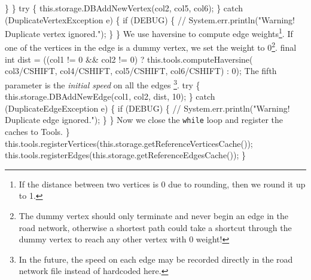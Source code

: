   \}
\}
try \{
  this.storage.DBAddNewVertex(col2, col5, col6);
\} catch (DuplicateVertexException e) \{
  if (DEBUG) \{
    // System.err.println("Warning! Duplicate vertex ignored.");
  \}
\}
\nwendcode{}\nwdocspar
{\small We use haversine to compute edge weights\footnote{If the distance between two
vertices is 0 due to rounding, then we round it up to 1.}.  If one of the
vertices in the edge is a dummy vertex, we set the weight to 0\footnote{The
dummy vertex should only terminate and never begin an edge in the road network,
otherwise a shortest path could take a shortcut through the dummy vertex to
reach any other vertex with 0 weight!}.}
\nwenddocs{}\plusendmoddef
final int dist = ((col1 != 0 && col2 != 0)
  ? this.tools.computeHaversine(
        col3/CSHIFT, col4/CSHIFT,
        col5/CSHIFT, col6/CSHIFT) : 0);
\nwendcode{}\nwdocspar
{\small The fifth parameter is the \textit{initial speed} on all the edges
\footnote{In the future, the speed on each edge may be recorded directly in the
road network file instead of hardcoded here.}.}
\nwenddocs{}\plusendmoddef
try \{
  this.storage.DBAddNewEdge(col1, col2, dist, 10);
\} catch (DuplicateEdgeException e) \{
  if (DEBUG) \{
    // System.err.println("Warning! Duplicate edge ignored.");
  \}
\}
\nwendcode{}\nwdocspar
{\small Now we close the {\tt{}while} loop and register the caches to Tools.}
\nwenddocs{}\plusendmoddef
  \}
  this.tools.registerVertices(this.storage.getReferenceVerticesCache());
  this.tools.registerEdges(this.storage.getReferenceEdgesCache());
\}
\nwendcode{}

